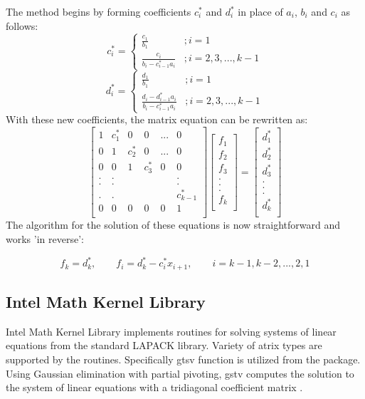 \documentclass[12pt, oneside]{book}
\theoremstyle{plain}
\theoremstyle{definition}
\begin{document}
The method begins by forming coefficients \(c^{*}_i\) and \(d^{*}_i\) in place of \(a_i\), \(b_i\) and \(c_i\) as follows:
$$
c^{*}_i = \left\{
     \begin{array}{lr}
       \frac{c_1}{b_1} & ; i = 1\\
       \frac{c_i}{b_i - c^{*}_{i-1} a_i} & ; i = 2,3,...,k-1
     \end{array}
   \right.
$$
$$   
d^{*}_i = \left\{
     \begin{array}{lr}
       \frac{d_1}{b_1} & ; i = 1\\
       \frac{d_i-d^{*}_{i-1} a_i}{b_i - c^{*}_{i-1} a_i} & ; i = 2,3,...,k-1
     \end{array}
   \right.
   $$
With these new coefficients, the matrix equation can be rewritten as:
$$
\begin{bmatrix}  
1 & c^{*}_1 & 0 & 0 & ... & 0 \\ 
0 & 1 & c^{*}_2 & 0 & ... & 0 \\ 
0 & 0 & 1 & c^{*}_3 & 0 & 0 \\ 
. & . &  &  &  & . \\ 
. & . &  &  &  & . \\ 
. & . &  &  &  & c^{*}_{k-1} \\ 
0 & 0 & 0 & 0 & 0 & 1 \\ 
\end{bmatrix} \begin{bmatrix}  
f_1 \\ 
f_2 \\ 
f_3 \\ 
.\\ 
.\\ 
.\\ 
f_k \\ 
\end{bmatrix} = \begin{bmatrix} 
d^{*}_1 \\ 
d^{*}_2 \\ 
d^{*}_3 \\ 
.\\ 
.\\ 
.\\ 
d^{*}_k \\ 
\end{bmatrix}
$$
The algorithm for the solution of these equations is now straightforward and works 'in reverse':

\[ f_k = d^{*}_k, \qquad f_i = d^{*}_k - c^{*}_i x_{i+1}, \qquad i = k-1, k-2, ... ,2,1 \]

 \subsection{Intel Math Kernel Library}
Intel Math Kernel Library implements routines for solving systems of linear equations from the standard LAPACK library. Variety of atrix types are supported by the routines.  Specifically gtsv function is utilized from the package. Using Gaussian elimination with partial pivoting, gstv computes the solution to the system of linear equations with a tridiagonal coefficient matrix \cite{gtsv}.  
\end{document}
